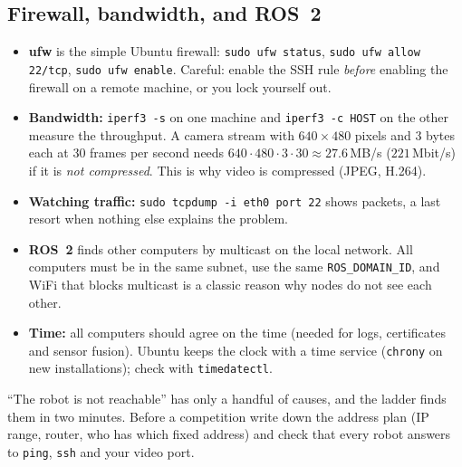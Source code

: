 \subsection*{Firewall, bandwidth, and ROS~2}
\begin{itemize}[nosep]
  \item \textbf{ufw} is the simple Ubuntu firewall: \verb|sudo ufw status|, \verb|sudo ufw allow 22/tcp|, \verb|sudo ufw enable|. Careful: enable the SSH rule \emph{before} enabling the firewall on a remote machine, or you lock yourself out.
  \item \textbf{Bandwidth:} \texttt{iperf3 -s} on one machine and \texttt{iperf3 -c HOST} on the other measure the throughput. A camera stream with $640\times480$ pixels and $3$ bytes each at $30$ frames per second needs $640\cdot480\cdot3\cdot30\approx27.6$\,MB/s ($221$\,Mbit/s) if it is \emph{not compressed}. This is why video is compressed (JPEG, H.264).
  \item \textbf{Watching traffic:} \verb|sudo tcpdump -i eth0 port 22| shows packets, a last resort when nothing else explains the problem.
  \item \textbf{ROS~2} finds other computers by multicast on the local network. All computers must be in the same subnet, use the same \texttt{ROS\_DOMAIN\_ID}, and WiFi that blocks multicast is a classic reason why nodes do not see each other.
  \item \textbf{Time:} all computers should agree on the time (needed for logs, certificates and sensor fusion). Ubuntu keeps the clock with a time service (\texttt{chrony} on new installations); check with \verb|timedatectl|.
\end{itemize}

\begin{aibox}
``The robot is not reachable'' has only a handful of causes, and the ladder finds them in two minutes. Before a competition write down the address plan (IP range, router, who has which fixed address) and check that every robot answers to \texttt{ping}, \texttt{ssh} and your video port.
\end{aibox}

